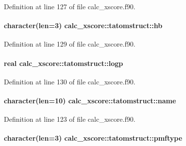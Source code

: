 Definition at line 127 of file calc\-\_\-xscore.\-f90.

\hypertarget{structcalc__xscore_1_1tatomstruct_a099d03185ba0190f15f22fd15c6070cc}{
\paragraph[{hb}]{\setlength{\rightskip}{0pt plus 5cm}character(len=3) calc\-\_\-xscore\-::tatomstruct\-::hb}}\label{structcalc__xscore_1_1tatomstruct_a099d03185ba0190f15f22fd15c6070cc}


Definition at line 129 of file calc\-\_\-xscore.\-f90.

\hypertarget{structcalc__xscore_1_1tatomstruct_aee3e2020736a98adf6f1c9812b5e0880}{
\paragraph[{logp}]{\setlength{\rightskip}{0pt plus 5cm}real calc\-\_\-xscore\-::tatomstruct\-::logp}}\label{structcalc__xscore_1_1tatomstruct_aee3e2020736a98adf6f1c9812b5e0880}


Definition at line 130 of file calc\-\_\-xscore.\-f90.

\hypertarget{structcalc__xscore_1_1tatomstruct_a9ca731880e78fd494b3647278db68a30}{
\paragraph[{name}]{\setlength{\rightskip}{0pt plus 5cm}character(len=10) calc\-\_\-xscore\-::tatomstruct\-::name}}\label{structcalc__xscore_1_1tatomstruct_a9ca731880e78fd494b3647278db68a30}


Definition at line 123 of file calc\-\_\-xscore.\-f90.

\hypertarget{structcalc__xscore_1_1tatomstruct_ab15ef1e2c1992fbf412b5fa2d6004eb1}{
\paragraph[{pmftype}]{\setlength{\rightskip}{0pt plus 5cm}character(len=3) calc\-\_\-xscore\-::tatomstruct\-::pmftype}}\label{structcalc__xscore_1_1tatomstruct_ab15ef1e2c1992fbf412b5fa2d6004eb1}



